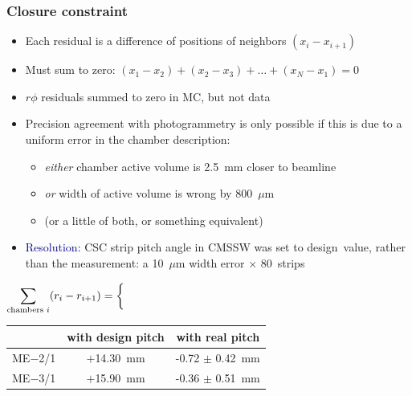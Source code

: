 \documentclass[compress]{beamer}
\begin{document}
\begin{frame}
\frametitle{Closure constraint}
\begin{itemize}\setlength{\itemsep}{0.25 cm}
\item Each residual is a difference of positions of neighbors $(x_i - x_{i+1})$
\item Must sum to zero: $(x_1 - x_2) + (x_2 - x_3) + \ldots + (x_N - x_1) = 0$
\item $r\phi$ residuals summed to zero in MC, but not data
\item Precision agreement with photogrammetry is only possible if this
  is due to a uniform error in the chamber description:
\begin{itemize}
\item {\it either} chamber active volume is 2.5~mm closer to beamline
\item {\it or} width of active volume is wrong by 800~$\mu$m
\item (or a little of both, or something equivalent)
\end{itemize}
\item \textcolor{darkblue}{Resolution:} CSC strip pitch angle in CMSSW
  was set to \mbox{design value,\hspace{-0.25 cm}} rather than the measurement: a 10~$\mu$m width
  error $\times$ 80~strips
\end{itemize}
\begin{center}
\hspace{-1 cm} $\displaystyle \sum_{\mbox{\scriptsize chambers }i} (r_i - r_{i+1}) = \bigg\{$
\begin{tabular}{c c c}
& with design pitch & with real pitch \\\hline
ME$-$2/1 & $+$14.30~mm & -0.72 $\pm$ 0.42~mm \\
ME$-$3/1 & $+$15.90~mm & -0.36 $\pm$ 0.51~mm \\
\end{tabular}
\end{center}
\end{frame}
\end{document}
